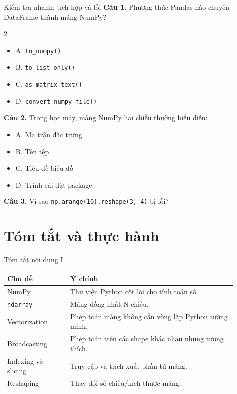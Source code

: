 \documentclass[aspectratio=169,11pt]{beamer}
\newcommand{\quiztitle}[1]{\textbf{\textcolor{QuizOrange}{#1}}}
\begin{document}
\begin{frame}{Kiểm tra nhanh: tích hợp và lỗi}
\small
\quiztitle{Câu 1.} Phương thức Pandas nào chuyển DataFrame thành mảng NumPy?
\begin{multicols}{2}
\begin{itemize}
  \item A. \texttt{to\_numpy()}
  \item B. \texttt{to\_list\_only()}
  \item C. \texttt{as\_matrix\_text()}
  \item D. \texttt{convert\_numpy\_file()}
\end{itemize}
\end{multicols}
\quiztitle{Câu 2.} Trong học máy, mảng NumPy hai chiều thường biểu diễn:
\begin{itemize}
  \item A. Ma trận đặc trưng
  \item B. Tên tệp
  \item C. Tiêu đề biểu đồ
  \item D. Trình cài đặt package
\end{itemize}
\quiztitle{Câu 3.} Vì sao \texttt{np.arange(10).reshape(3, 4)} bị lỗi?
\end{frame}

\section{Tóm tắt và thực hành}

\begin{frame}{Tóm tắt nội dung I}
\small
\begin{tabular}{p{0.25\linewidth}p{0.66\linewidth}}
\toprule
\textbf{Chủ đề} & \textbf{Ý chính} \\
\midrule
NumPy & Thư viện Python cốt lõi cho tính toán số. \\
\texttt{ndarray} & Mảng đồng nhất N chiều. \\
Vectorization & Phép toán mảng không cần vòng lặp Python tường minh. \\
Broadcasting & Phép toán trên các shape khác nhau nhưng tương thích. \\
Indexing và slicing & Truy cập và trích xuất phần tử mảng. \\
Reshaping & Thay đổi số chiều/kích thước mảng. \\
\bottomrule
\end{tabular}
\end{frame}
\end{document}
